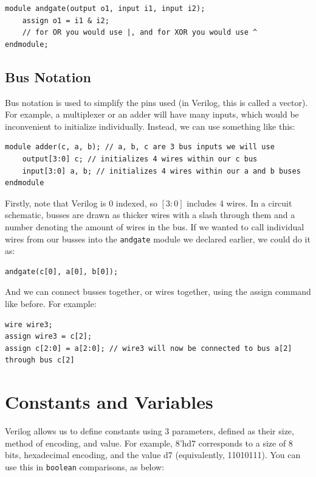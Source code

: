 \documentclass[12pt]{report}
\newcommand{\lst}{\lstinline}
\newcommand{\bs}{\bigskip}
\begin{document}
\bs 
\begin{lstlisting}
module andgate(output o1, input i1, input i2);
    assign o1 = i1 & i2;
    // for OR you would use |, and for XOR you would use ^
endmodule;
\end{lstlisting}
\bs


\subsection{Bus Notation} Bus notation is used to simplify the pins used (in Verilog, this is called a vector). For example, a multiplexer or an adder will have many inputs, which would be inconvenient to initialize individually. Instead, we can use  something like this: 

\bs
\begin{lstlisting}
module adder(c, a, b); // a, b, c are 3 bus inputs we will use
    output[3:0] c; // initializes 4 wires within our c bus
    input[3:0] a, b; // initializes 4 wires within our a and b buses
endmodule
\end{lstlisting}
\bs

Firstly, note that Verilog is 0 indexed, so $[3:0]$ includes 4 wires. In a circuit schematic, busses are drawn as thicker wires with a slash through them and a number denoting the amount of wires in the bus. If we wanted to call individual wires from our busses into the \lst{andgate} module we declared earlier, we could do it as: 

\bs 
\begin{lstlisting}
andgate(c[0], a[0], b[0]); 
\end{lstlisting}
\bs

And we can connect busses together, or wires together, using the assign command like before. For example: 

\bs 
\begin{lstlisting}
wire wire3; 
assign wire3 = c[2];
assign c[2:0] = a[2:0]; // wire3 will now be connected to bus a[2] through bus c[2]
\end{lstlisting}
\bs

\section{Constants and Variables}
Verilog allows us to define constants using 3 parameters, defined as their size, method of encoding, and value. For example, 8'hd7 corresponds to a size of 8 bits, hexadecimal encoding, and the value d7 (equivalently, 11010111). You can use this in \lst{boolean} comparisons, as below: 
\end{document}
